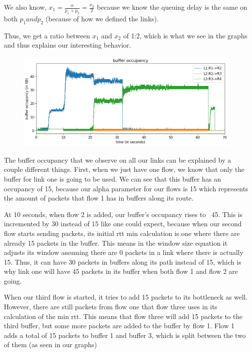 \documentclass{article}
\begin{document}
We also know, $x_1 = \frac{\alpha}{p_1 + p_2} = \frac{x_2}{ 2}$ because we know the queuing delay is the same on both $p_1 and p_2$ (because of how we defined the links).

Thus, we get a ratio between $x_1$ and $x_2$ of 1:2, which is what we see in the graphs and thus explains our interesting behavior.

\begin{figure}[H]
\centering
\includegraphics[width = \textwidth]{test_case2_fast buffer occupancy.png}
\end{figure}

The buffer occupancy that we observe on all our links can be explained by a couple different things. First, when we just have one flow, we know that only the buffer for link one is going to be used. We can see that this buffer has an occupancy of 15, because our alpha parameter for our flows is 15 which represents the amount of packets that flow 1 has in buffers along its route. 

At 10 seconds, when flow 2 is added, our buffer's occupancy rises to ~45. This is incremented by 30 instead of 15 like one could expect, because when our second flow starts sending packets, its initial rtt min calculation is one where there are already 15 packets in the buffer. This means in the window size equation it adjusts its window assuming there are 0 packets in a link where there is actually 15. Thus, it can have 30 packets in buffers along its path instead of 15, which is why link one will have 45 packets in its buffer when both flow 1 and flow 2 are going.

When our third flow is started, it tries to add 15 packets to its bottleneck as well. However, there are still packets from flow one that flow three uses in its calculation of the min rtt. This means that flow three will add 15 packets to the third buffer, but some more packets are added to the buffer by flow 1. Flow 1 adds a total of 15 packets to buffer 1 and buffer 3, which is split between the two of them (as seen in our graphs)
\end{document}
